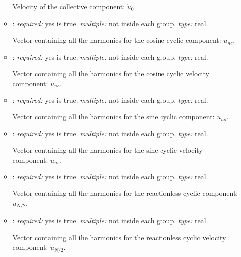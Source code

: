 \begin{itemize}
\begin{itemize}
    Velocity of the collective component: $\dot{u}_0$.

    \item {}: \textit{required:} yes  is true. 
    \textit{multiple:} not inside each  group. \textit{type:} real. 

    Vector containing all the harmonics for the cosine cyclic component: $u_{nc}$. 

    \item {}: \textit{required:} yes  is true. 
    \textit{multiple:} not inside each  group. \textit{type:} real. 

    Vector containing all the harmonics for the cosine cyclic velocity component: $\dot{u}_{nc}$. 
    
    \item {}: \textit{required:} yes  is true. 
    \textit{multiple:} not inside each  group. \textit{type:} real. 

    Vector containing all the harmonics for the sine cyclic component: $u_{ns}$. 

    \item {}: \textit{required:} yes  is true. 
    \textit{multiple:} not inside each  group. \textit{type:} real. 

    Vector containing all the harmonics for the sine cyclic velocity component: $\dot{u}_{ns}$. 

    \item {}: \textit{required:} yes  is true. 
    \textit{multiple:} not inside each  group. \textit{type:} real. 

    Vector containing all the harmonics for the reactionless cyclic component: $u_{N/2}$. 

    \item {}: \textit{required:} yes  is true. 
    \textit{multiple:} not inside each  group. \textit{type:} real. 

    Vector containing all the harmonics for the reactionless cyclic velocity component: $\dot{u}_{N/2}$. 
    
    \end{itemize}
\end{itemize}

